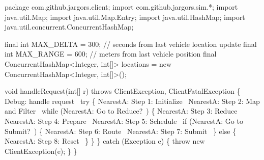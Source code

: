 \nwenddocs{}\endmoddef\nwstartdeflinemarkup{}\nwenddeflinemarkup
package com.github.jargors.client;
import com.github.jargors.sim.*;
import java.util.Map;
import java.util.Map.Entry;
import java.util.HashMap;
import java.util.concurrent.ConcurrentHashMap;
\nwendcode{}\nwdocspar

\nwenddocs{}\endmoddef\nwstartdeflinemarkup{}\nwenddeflinemarkup
final int MAX_DELTA = 300;  // seconds from last vehicle location update
final int MAX_RANGE = 600;  // meters from last vehicle position
final ConcurrentHashMap<Integer, int[]> locations =
  new ConcurrentHashMap<Integer, int[]>();
\nwendcode{}\nwdocspar

\nwenddocs{}\endmoddef\nwstartdeflinemarkup{}\nwenddeflinemarkup
void handleRequest(int[] r) throws ClientException, ClientFatalException \{
  \LA{}Debug: handle request~{\nwtagstyle{}}\RA{}
  try \{
    \LA{}NearestA: Step 1: Initialize~{\nwtagstyle{}}\RA{}
    \LA{}NearestA: Step 2: Map and Filter~{\nwtagstyle{}}\RA{}
    while (\LA{}NearestA: Go to Reduce?~{\nwtagstyle{}}\RA{}) \{
      \LA{}NearestA: Step 3: Reduce~{\nwtagstyle{}}\RA{}
      \LA{}NearestA: Step 4: Prepare~{\nwtagstyle{}}\RA{}
      \LA{}NearestA: Step 5: Schedule~{\nwtagstyle{}}\RA{}
      if (\LA{}NearestA: Go to Submit?~{\nwtagstyle{}}\RA{}) \{
        \LA{}NearestA: Step 6: Route~{\nwtagstyle{}}\RA{}
        \LA{}NearestA: Step 7: Submit~{\nwtagstyle{}}\RA{}
      \} else \{
        \LA{}NearestA: Step 8: Reset~{\nwtagstyle{}}\RA{}
      \}
    \}
  \} catch (Exception e) \{
    throw new ClientException(e);
  \}
\}
\nwendcode{}\nwdocspar

